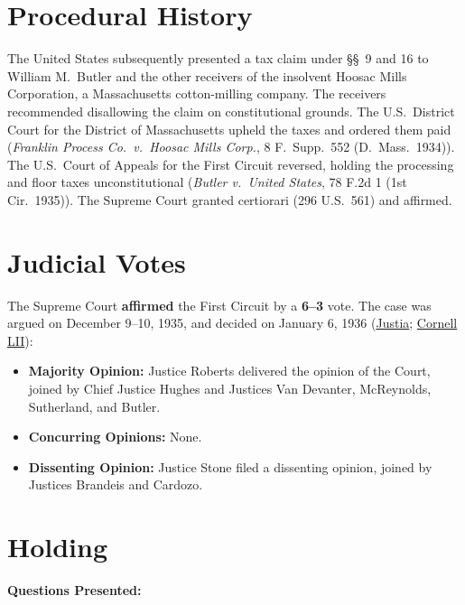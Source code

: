 \documentclass[12pt]{article}
\begin{document}
\section{Procedural History}
The United States subsequently presented a tax claim under \S\S\ 9 and 16 to William M.\ Butler and the other receivers of the insolvent Hoosac Mills Corporation, a Massachusetts cotton-milling company. The receivers recommended disallowing the claim on constitutional grounds. The U.S.\ District Court for the District of Massachusetts upheld the taxes and ordered them paid (\textit{Franklin Process Co.\ v.\ Hoosac Mills Corp.}, 8 F.\ Supp.\ 552 (D.\ Mass.\ 1934)). The U.S.\ Court of Appeals for the First Circuit reversed, holding the processing and floor taxes unconstitutional (\textit{Butler v.\ United States}, 78 F.2d 1 (1st Cir.\ 1935)). The Supreme Court granted certiorari (296 U.S.\ 561) and affirmed.

\section{Judicial Votes}
The Supreme Court \textbf{affirmed} the First Circuit by a \textbf{6--3} vote. The case was argued on December 9--10, 1935, and decided on January 6, 1936 (\href{https://supreme.justia.com/cases/federal/us/297/1/}{Justia}; \href{https://www.law.cornell.edu/supremecourt/text/297/1}{Cornell LII}):

\begin{itemize}
    \item \textbf{Majority Opinion:} Justice Roberts delivered the opinion of the Court, joined by Chief Justice Hughes and Justices Van Devanter, McReynolds, Sutherland, and Butler.
    \item \textbf{Concurring Opinions:} None.
    \item \textbf{Dissenting Opinion:} Justice Stone filed a dissenting opinion, joined by Justices Brandeis and Cardozo.
\end{itemize}

\section{Holding}
\textbf{Questions Presented:}
\end{document}
